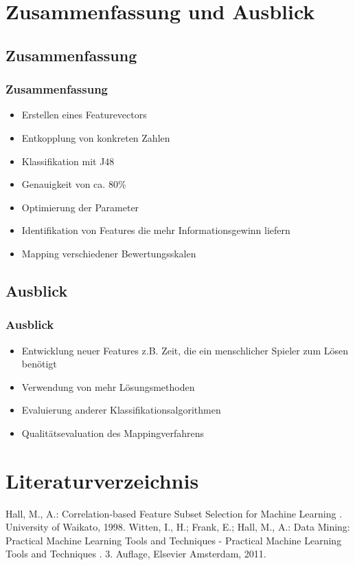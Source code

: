 \documentclass[accentcolor=tud6b,colorbacktitle,inverttitle,landscape,german,presentation,t]{tudbeamer}
\begin{document}
\section{Zusammenfassung und Ausblick}
	\subsection{Zusammenfassung}
		\begin{frame}
		\frametitle{Zusammenfassung}
		\begin{itemize}
		\item Erstellen eines Featurevectors
		\item Entkopplung von konkreten Zahlen
		\item Klassifikation mit J48
		\item Genauigkeit von ca. 80\%
		\item Optimierung der Parameter
		\item Identifikation von Features die mehr Informationsgewinn liefern
		\item Mapping verschiedener Bewertungsskalen
		\end{itemize}
		\end{frame}

	\subsection{Ausblick}
		\begin{frame}
		\frametitle{Ausblick}
		\begin{itemize}
		\item Entwicklung neuer Features z.B. Zeit, die ein menschlicher Spieler zum Lösen benötigt
		\item Verwendung von mehr Lösungsmethoden
		\item Evaluierung anderer Klassifikationsalgorithmen
		\item Qualitätsevaluation des Mappingverfahrens
		\end{itemize}
		\end{frame}

\section{Literaturverzeichnis} 
	\begin{thebibliography}{10} 
	Hall, M., A.: {\glqq Correlation-based Feature Subset Selection for Machine Learning \grqq}. University of Waikato, 1998. 
	Witten, I., H.; Frank, E.; Hall, M., A.: {\glqq Data Mining: Practical Machine Learning Tools and Techniques - Practical Machine Learning Tools and Techniques \grqq}. 3. Auflage, Elsevier Amsterdam, 2011. 
	\end{thebibliography}
\end{document}
